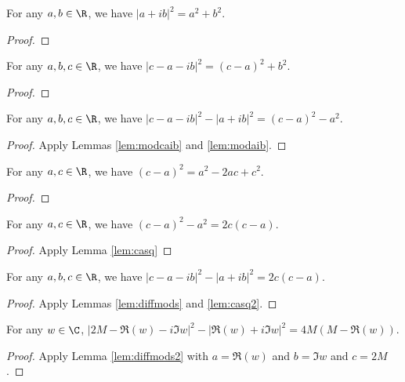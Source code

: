 \begin{lemma}\label{lem:modaib}  \leanok
For any $a,b \in \R$, we have $|a + ib|^2 = a^2 + b^2$.
\end{lemma}
\begin{proof} \leanok
\end{proof}

\begin{lemma}\label{lem:modcaib}  \leanok
For any $a,b,c \in \R$, we have $|c-a - ib|^2 = (c-a)^2 + b^2$.
\end{lemma}
\begin{proof}  \leanok
\end{proof}

\begin{lemma} \label{lem:diffmods}  \leanok
For any $a,b,c \in \R$, we have $|c-a - ib|^2 - |a + ib|^2 = (c-a)^2 - a^2$.
\end{lemma}
\begin{proof} \leanok {}
Apply Lemmas \ref{lem:modcaib} and \ref{lem:modaib}.
\end{proof}

\begin{lemma}\label{lem:casq}  \leanok
For any $a,c \in \R$, we have $(c-a)^2 = a^2-2ac+c^2$.
\end{lemma}
\begin{proof} \leanok
\end{proof}

\begin{lemma}\label{lem:casq2}  \leanok
For any $a,c \in \R$, we have $(c-a)^2 - a^2 = 2c(c-a)$.
\end{lemma}
\begin{proof}  \leanok
Apply Lemma \ref{lem:casq}
\end{proof}

\begin{lemma}\label{lem:diffmods2}  \leanok
For any $a,b,c \in \R$, we have $|c-a - ib|^2 - |a + ib|^2 = 2c(c-a)$.
\end{lemma}
\begin{proof}  \leanok
Apply Lemmas \ref{lem:diffmods} and \ref{lem:casq2}.
\end{proof}

\begin{lemma}\label{lem:modulus_sq_ReImw}  \leanok
For any $w \in \C$, $|2M-\Re(w) - i\Im w|^2 - |\Re(w) + i\Im w|^2 = 4M(M - \Re(w))$.
\end{lemma}
\begin{proof}  \leanok
Apply Lemma \ref{lem:diffmods2} with $a=\Re(w)$ and $b=\Im w$ and $c=2M$.
\end{proof}

